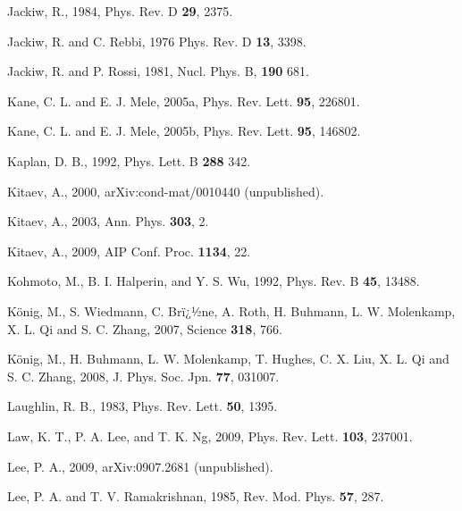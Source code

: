 \documentclass[twocolumn,floatfix,showpacs,rmp,aps]{revtex4}
\begin{document}
\begin{thebibliography}{99}
		Jackiw, R., 1984,
		Phys. Rev. D {\bf 29}, 2375.
		
		Jackiw, R. and C. Rebbi, 1976
		Phys. Rev. D {\bf 13}, 3398.
		
		Jackiw, R. and P. Rossi, 1981,
		Nucl. Phys. B, {\bf 190} 681.
		
		Kane, C. L. and E. J. Mele, 2005a,
		Phys. Rev. Lett. {\bf 95}, 226801.
		
		Kane, C. L. and E. J. Mele, 2005b,
		Phys. Rev. Lett. {\bf 95}, 146802.
		
		Kaplan, D. B., 1992,
		Phys. Lett. B {\bf 288} 342.
		
		Kitaev, A., 2000,
		arXiv:cond-mat/0010440 (unpublished).
		
		Kitaev, A., 2003,
		Ann. Phys. {\bf 303}, 2.
		
		Kitaev, A., 2009,
		AIP Conf. Proc. {\bf 1134}, 22.
		
		Kohmoto, M., B. I. Halperin, and Y. S. Wu, 1992,
		Phys. Rev. B {\bf 45}, 13488.
		
		K\"onig, M., S. Wiedmann, C. Brï¿½ne, A. Roth, H. Buhmann, L. W. Molenkamp,
		X. L. Qi and S. C. Zhang, 2007,
		Science {\bf 318}, 766.
		
		K\"onig, M., H. Buhmann, L. W. Molenkamp, T. Hughes, C. X. Liu,
		X. L. Qi and S. C. Zhang, 2008,
		J. Phys. Soc. Jpn. {\bf 77}, 031007.
		
		Laughlin, R. B., 1983,
		Phys. Rev. Lett. {\bf 50}, 1395.
		
		Law, K. T., P. A. Lee, and T. K. Ng, 2009,
		Phys. Rev. Lett. {\bf 103}, 237001.
		
		Lee, P. A., 2009,
		arXiv:0907.2681 (unpublished).
		
		Lee, P. A.  and T. V. Ramakrishnan, 1985,
		Rev. Mod. Phys. {\bf 57}, 287.
		

\end{thebibliography}
\end{document}
